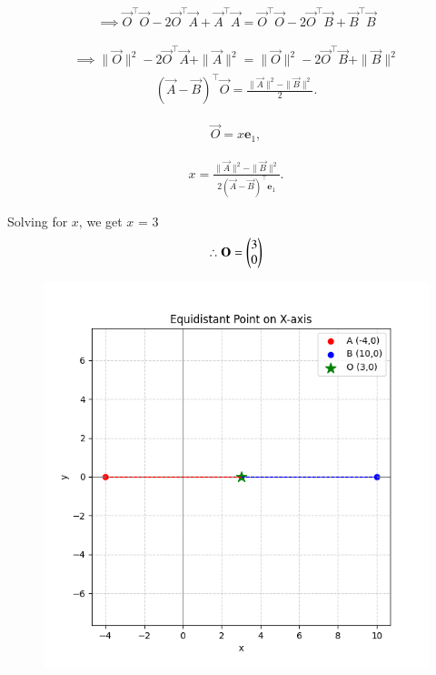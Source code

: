 \documentclass[journal]{IEEEtran}
\begin{document}
\begin{align}
\implies \vec{O}^{\top}\vec{O} - 2\vec{O}^{\top}\vec{A} + \vec{A}^{\top}\vec{A}
= \vec{O}^{\top}\vec{O} - 2\vec{O}^{\top}\vec{B} + \vec{B}^{\top}\vec{B}
\end{align}


\begin{align}
\implies \|\vec{O}\|^2 - 2\vec{O}^{\top}\vec{A} + \|\vec{A}\|^2
= \|\vec{O}\|^2 - 2\vec{O}^{\top}\vec{B} + \|\vec{B}\|^2
\end{align}
\begin{align}
    (\vec{A}-\vec{B})^{\top}\vec{O}=\frac{\|\vec{A}\|^2-\|\vec{B}\|^2}{2}.
\end{align}

\begin{align}
     \vec{O} = x \mathbf{e}_1,
\end{align}

\begin{align}
    x = \frac{\|\vec{A}\|^2 - \|\vec{B}\|^2}{2 (\vec{A} - \vec{B})^{\top} \mathbf{e}_1}.
\end{align}

Solving for $x$, we get $x$ = $3$\\

\begin{align}
    \therefore \vec{O} = \myvec{$3$ \\ $0$}
\end{align}
\begin{figure}[h!]
    \centering
    \includegraphics[height=0.5\textheight, keepaspectratio]{figs/Figure_1.png}
    \label{figure_1}
\end{figure}
\end{document}
